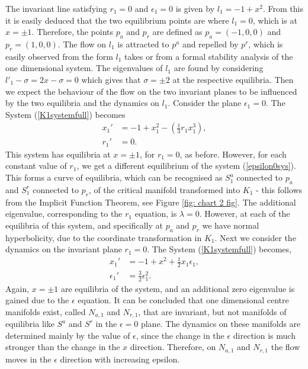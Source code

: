 The invariant line satisfying $r_1=0$ and $\epsilon_1=0$ is given by $l_1= -1 +x^2$. From this it is easily deduced that the two equilibrium points are where $l_1=0$, which is at $x=\pm1$. Therefore, the points $p_a$ and $p_r$ are defined as $p_a= (-1,0,0)$ and $p_r=(1,0,0)$. The flow on $l_1$ is attracted to $p^a$ and repelled by $p^r$, which is easily observed from the form $l_1$ takes or from a formal stability analysis of the one dimensional system. The eigenvalues of $l_1$ are found  by considering $l'_1 - \sigma = 2x - \sigma= 0 $ which gives that $\sigma = \pm 2$ at the respective equilibria. Then we expect the behaviour of the flow on the two invariant planes to be influenced by the two equilibria and the dynamics on $l_1$.
Consider the plane $\epsilon_1=0$. The System (\ref{K1systemfull}) becomes
\begin{equation}
\begin{aligned} \label{epsilon0sys}
x_1' &= -1 +x_1^2 - \left( \frac{1}{3}r_1x_1^3 \right),\\
r_1' &= 0.
\end{aligned}
\end{equation}
This system has equilibria at $x= \pm1$, for $r_1=0$, as before. However, for each constant value of $r_1$, we get a different equilibrium of the system (\ref{epsilon0sys}). This forms a curve of equilibria, which can be recognised as $S^a_1$ connected to $p_a$ and $S^r_1$ connected to $p_r$, of the critical manifold transformed into $K_1$ - this follows from the Implicit Function Theorem, see Figure \ref{fig: chart 2 fig}. The additional eigenvalue, corresponding to the $r_1$ equation, is $\lambda=0$. However, at each of the equilibria of this system, and specifically at $p_a$ and $p_r$ we have normal hyperbolicity, due to the coordinate transformation in $K_1$. Next we consider the dynamics on the invariant plane $r_1=0$.
The System (\ref{K1systemfull}) becomes, 
\begin{equation}
\begin{aligned}
x_1' &= -1 +x^2 + \frac{1}{2} x_1 \epsilon_1, \\
\epsilon_1' &= \frac{3}{2} \epsilon_1^2 .
\end{aligned}
\end{equation}
Again, $x= \pm 1$ are equilibria of the system, and an additional zero eigenvalue is gained due to the $\epsilon$ equation. It can be concluded that one dimensional centre manifolds exist, called $N_{a,1}$ and $N_{r,1}$, that are invariant, but not manifolds of equilibria like $S^a$ and $S^r$ in the $\epsilon=0$ plane. The dynamics on these manifolds are determined mainly by the value of $\epsilon$, since the change in the $\epsilon$ direction is much stronger than the change in the $x$ direction. Therefore, on $N_{a,1}$ and $N_{r,1}$ the flow moves in the $\epsilon$ direction with increasing epsilon.
